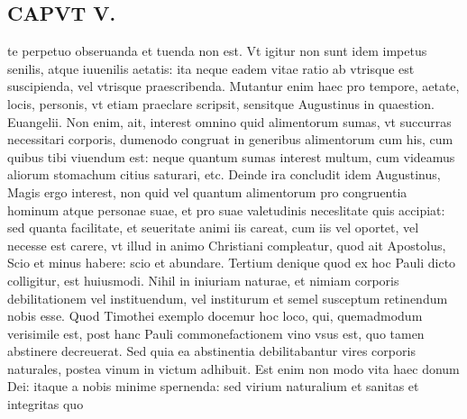 \documentclass{article}
\begin{document}
\begin{pages}
\section*{CAPVT V. }
\marginpar{[ p.381 ]}\pstart te perpetuo obseruanda et tuenda non est. Vt igitur non sunt idem impetus senilis, atque iuuenilis aetatis: ita neque eadem vitae ratio ab vtrisque est suscipienda, vel vtrisque praescribenda. Mutantur enim haec pro tempore, aetate, locis, personis, vt etiam praeclare scripsit, sensitque Augustinus in quaestion. Euangelii. Non enim, ait, interest omnino quid alimentorum sumas, vt succurras necessitari corporis, dumenodo congruat in generibus alimentorum cum his, cum quibus tibi viuendum est: neque quantum sumas interest multum, cum videamus aliorum stomachum citius saturari, etc. Deinde ira concludit idem Augustinus, Magis ergo interest, non quid vel quantum alimentorum pro congruentia hominum atque personae suae, et pro suae valetudinis neceslitate quis accipiat: sed quanta facilitate, et seueritate animi iis careat, cum iis vel oportet, vel necesse est carere, vt illud in animo Christiani compleatur, quod ait Apostolus, Scio et minus habere: scio et abundare. Tertium denique quod ex hoc Pauli dicto colligitur, est huiusmodi. Nihil in iniuriam naturae, et nimiam corporis debilitationem vel instituendum, vel institurum et semel susceptum retinendum nobis esse. Quod Timothei exemplo docemur hoc loco, qui, quemadmodum verisimile est, post hanc Pauli commonefactionem vino vsus est, quo tamen abstinere decreuerat. Sed quia ea abstinentia debilitabantur vires corporis naturales, postea vinum in victum adhibuit. Est enim non modo vita haec donum Dei: itaque a nobis minime spernenda: sed virium naturalium et sanitas et integritas quo\pend

\end{pages}
\end{document}
